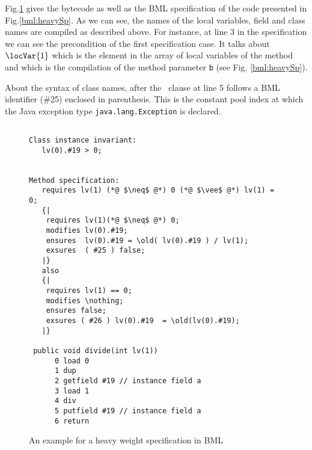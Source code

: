  Fig.\ref{bml:heavySpBML} gives the bytecode as well as the BML specification
 of the code presented in   Fig.\ref{bml:heavySp}. As we can see, the names of the local variables, field and class names  
 are compiled as described above.
 For instance, at line 3 in the specification we can see the precondition of the first specification case.
 It talks about $\locVar{1}$ which is the element in the array of local variables
 of the method  and which is the compilation of  the method parameter \texttt{b} (see Fig. \ref{bml:heavySp}). 

About the syntax of class names,  after the
 \exsures \ clause at line 5 follows a BML identifier (\#25) enclosed in parenthesis.
 This is the constant pool index at which the Java exception  type \texttt{java.lang.Exception} is declared.
 
\begin{figure}[ht!]
\begin{lstlisting}[frame=trbl]

Class instance invariant: 
   lv(0).#19 > 0;
 

Method specification:
   requires lv(1) (*@ $\neq$ @*) 0 (*@ $\vee$ @*) lv(1) = 0;
   {| 
    requires lv(1)(*@ $\neq$ @*) 0;
    modifies lv(0).#19;
    ensures  lv(0).#19 = \old( lv(0).#19 ) / lv(1);
    exsures  ( #25 ) false;  
   |}
   also 
   {|
    requires lv(1) == 0;
    modifies \nothing;
    ensures false;
    exsures ( #26 ) lv(0).#19  = \old(lv(0).#19);
   |}

 public void divide(int lv(1)) 
      0 load 0
      1 dup
      2 getfield #19 // instance field a
      3 load 1
      4 div
      5 putfield #19 // instance field a
      6 return
\end{lstlisting}
\caption{\sc An example for a heavy weight specification in BML} \label{bml:heavySpBML}
\end{figure}

